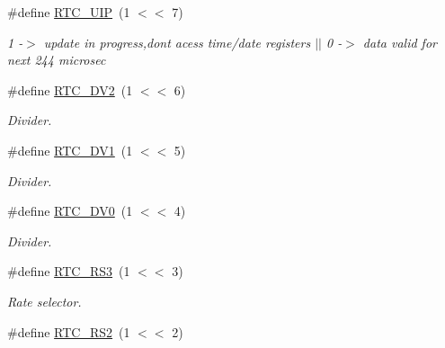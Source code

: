 \begin{DoxyCompactItemize}
\item 
\hypertarget{group___r_t_c_ga2ebe3d816d8b2e9f1be075554e4135b3}{\#define \hyperlink{group___r_t_c_ga2ebe3d816d8b2e9f1be075554e4135b3}{R\-T\-C\-\_\-\-U\-I\-P}~(1 $<$$<$ 7)}\label{group___r_t_c_ga2ebe3d816d8b2e9f1be075554e4135b3}

\begin{DoxyCompactList}\small\item\em 1 -\/$>$ update in progress,dont acess time/date registers $|$$|$ 0 -\/$>$ data valid for next 244 microsec \end{DoxyCompactList}\item 
\hypertarget{group___r_t_c_ga3e0bb1b127052d36bc4e5ef91e92fb89}{\#define \hyperlink{group___r_t_c_ga3e0bb1b127052d36bc4e5ef91e92fb89}{R\-T\-C\-\_\-\-D\-V2}~(1 $<$$<$ 6)}\label{group___r_t_c_ga3e0bb1b127052d36bc4e5ef91e92fb89}

\begin{DoxyCompactList}\small\item\em Divider. \end{DoxyCompactList}\item 
\hypertarget{group___r_t_c_gab24bb577503d1089e9257cb1172bdf23}{\#define \hyperlink{group___r_t_c_gab24bb577503d1089e9257cb1172bdf23}{R\-T\-C\-\_\-\-D\-V1}~(1 $<$$<$ 5)}\label{group___r_t_c_gab24bb577503d1089e9257cb1172bdf23}

\begin{DoxyCompactList}\small\item\em Divider. \end{DoxyCompactList}\item 
\hypertarget{group___r_t_c_ga5911071bc2a9af2eedbabd20b1daf528}{\#define \hyperlink{group___r_t_c_ga5911071bc2a9af2eedbabd20b1daf528}{R\-T\-C\-\_\-\-D\-V0}~(1 $<$$<$ 4)}\label{group___r_t_c_ga5911071bc2a9af2eedbabd20b1daf528}

\begin{DoxyCompactList}\small\item\em Divider. \end{DoxyCompactList}\item 
\hypertarget{group___r_t_c_ga151a2d40d9019b24ebc14861bbd67551}{\#define \hyperlink{group___r_t_c_ga151a2d40d9019b24ebc14861bbd67551}{R\-T\-C\-\_\-\-R\-S3}~(1 $<$$<$ 3)}\label{group___r_t_c_ga151a2d40d9019b24ebc14861bbd67551}

\begin{DoxyCompactList}\small\item\em Rate selector. \end{DoxyCompactList}\item 
\hypertarget{group___r_t_c_ga54d2328341e35419ce7111c8cf3b9d57}{\#define \hyperlink{group___r_t_c_ga54d2328341e35419ce7111c8cf3b9d57}{R\-T\-C\-\_\-\-R\-S2}~(1 $<$$<$ 2)}\label{group___r_t_c_ga54d2328341e35419ce7111c8cf3b9d57}


\end{DoxyCompactItemize}
